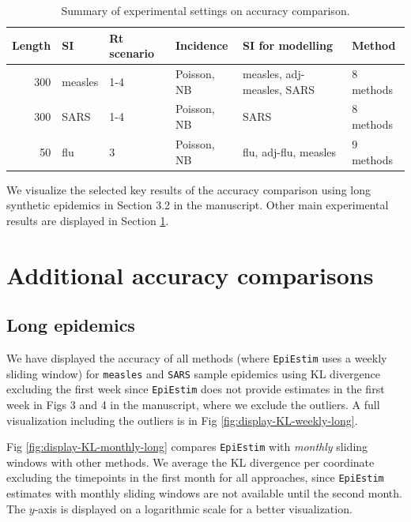 \documentclass[
]{article}
\begin{document}
\begin{table}
\centering
\caption{\label{tab:df-exp}Summary of experimental settings on accuracy comparison.}
\centering
\begin{tabular}[t]{rlllll}
\toprule
Length & SI & Rt scenario & Incidence & SI for modelling & Method\\
\midrule
300 & measles & 1-4 & Poisson, NB & measles, adj-measles, SARS & 8 methods\\
300 & SARS & 1-4 & Poisson, NB & SARS & 8 methods\\
50 & flu & 3 & Poisson, NB & flu, adj-flu, measles & 9 methods\\
\bottomrule
\end{tabular}
\end{table}

We visualize the selected key results of the accuracy comparison using long synthetic
epidemics in Section 3.2 in the manuscript. Other main experimental results are displayed in
Section \ref{sec:exp-accuracy}.

\clearpage

\hypertarget{sec:exp-accuracy}{%
\section{Additional accuracy comparisons}\label{sec:exp-accuracy}}

\hypertarget{long-epidemics}{%
\subsection{Long epidemics}\label{long-epidemics}}

We have displayed the accuracy of all methods (where \texttt{EpiEstim} uses a weekly
sliding window) for \texttt{measles} and \texttt{SARS} sample epidemics using KL divergence
excluding the first week since \texttt{EpiEstim} does not provide estimates in the first
week in Figs 3 and 4 in the manuscript, where we exclude the outliers.
A full visualization including the outliers is in Fig
\ref{fig:display-KL-weekly-long}.

Fig \ref{fig:display-KL-monthly-long} compares \texttt{EpiEstim} with \emph{monthly}
sliding windows with other methods. We average the KL divergence per coordinate
excluding the timepoints in the first month for all approaches, since \texttt{EpiEstim} 
estimates with monthly sliding windows are not available until the second month.
The \(y\)-axis is displayed on a logarithmic scale for a better visualization.
\end{document}
